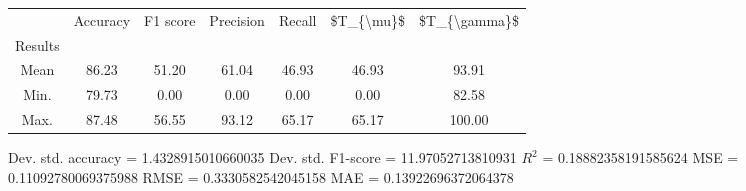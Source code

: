 \begin{tabular}{|c|c|c|c|c|c|c|}
\toprule
{} &  Accuracy &  F1 score &  Precision &  Recall &  \$T\_\{\textbackslash mu\}\$ &  \$T\_\{\textbackslash gamma\}\$ \\
Results &           &           &            &         &            &               \\
\hline
Mean    &     86.23 &     51.20 &      61.04 &   46.93 &      46.93 &         93.91 \\
Min.    &     79.73 &      0.00 &       0.00 &    0.00 &       0.00 &         82.58 \\
Max.    &     87.48 &     56.55 &      93.12 &   65.17 &      65.17 &        100.00 \\
\bottomrule
\end{tabular}

 Dev. std. accuracy = 1.4328915010660035
 Dev. std. F1-score = 11.97052713810931
 $R^2$ = 0.18882358191585624
 MSE = 0.11092780069375988
 RMSE = 0.3330582542045158
 MAE = 0.13922696372064378